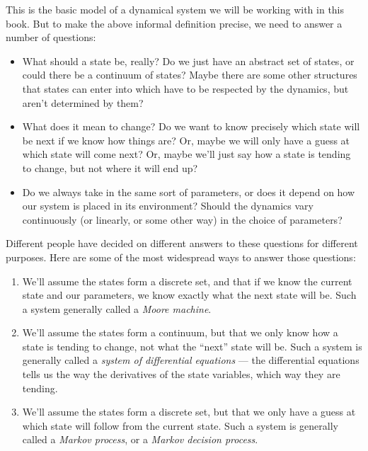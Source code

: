 \documentclass[DynamicalBook]{subfiles}
\begin{document}
This is the basic model of a dynamical system we will be working with in this
book. But to make the above informal definition precise, we need to answer
a number of questions:
\begin{itemize}
  \item What should a state be, really? Do we just have an abstract set of
    states, or could there be a continuum of states? Maybe there are some other
    structures that states can enter into which have to be respected by the
    dynamics, but aren't determined by them? 
  \item What does it mean to change? Do we want to know precisely which state
    will be next if we know how things are? Or, maybe we will only have a guess
    at which state will come next? Or, maybe we'll just say how a state is
    tending to change, but not where it will end up?
  \item Do we always take in the same sort of parameters, or does it depend on
    how our system is placed in its environment? Should the dynamics vary
    continuously (or linearly, or some other way) in the choice of parameters? 
\end{itemize}

Different people have decided on different answers to these questions for
different purposes. Here are some of the most widespread ways to answer those
questions:
\begin{enumerate}
  \item We'll assume the states form a discrete set, and that if we know the
    current state and our parameters, we know exactly what the next state will
    be. Such a system generally called a \emph{Moore machine}.
  \item We'll assume the states form a continuum, but that we only know how a
    state is tending to change, not what the ``next'' state will be. Such a
    system is generally called a \emph{system of
      differential equations} --- the differential equations tells us the way the
    derivatives of the state variables, which way they are tending.
  \item We'll assume the states form a discrete set, but that we only have a
    guess at which state will follow from the current state. Such a system is generally
    called a \emph{Markov process}, or a \emph{Markov decision process}.
\end{enumerate}
\end{document}
